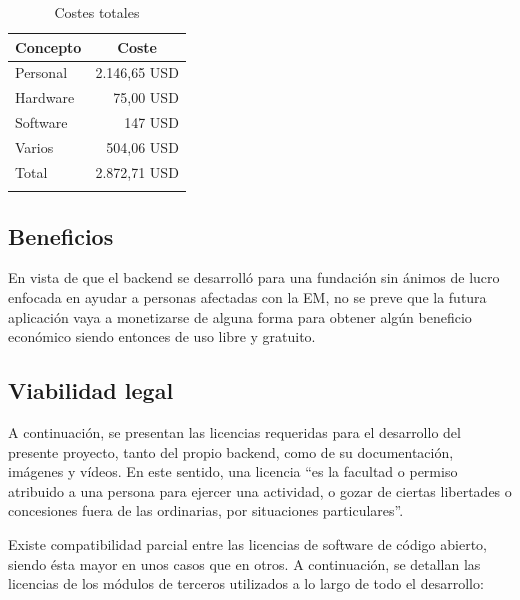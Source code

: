 \begin{longtable}[c]{@{}lr@{}}
\toprule
\multicolumn{1}{c}{\textbf{Concepto}} & \multicolumn{1}{c}{\textbf{Coste}} \\* \midrule
\endfirsthead
%
\endhead
%
\bottomrule
\endfoot
%
\endlastfoot
%
Personal & 2.146,65 USD \\
Hardware & 75,00 USD \\
Software & 147 USD \\
Varios & 504,06 USD \\
Total & 2.872,71 USD \\ \hline
\caption{Costes totales}
\label{tab:CostesTotal}
\end{longtable}
\newpage
\subsection{Beneficios}
En vista de que el backend se desarrolló para una fundación sin ánimos de lucro enfocada en ayudar a personas afectadas con la EM, no se preve que la futura aplicación vaya a monetizarse de alguna forma para obtener algún beneficio económico siendo entonces de uso libre y gratuito.

\subsection{Viabilidad legal}
A continuación, se presentan las licencias requeridas para el desarrollo del presente proyecto, tanto del propio backend, como de su documentación, imágenes y vídeos. En este sentido, una licencia “es la facultad o permiso atribuido a una persona para ejercer una actividad, o gozar de ciertas libertades o concesiones fuera de las ordinarias, por situaciones particulares”.\cite{art:licencias}

Existe compatibilidad parcial entre las licencias de software de código abierto, siendo ésta mayor en unos casos que en otros. A continuación, se detallan las licencias de los módulos de terceros utilizados a lo largo de todo el desarrollo:

